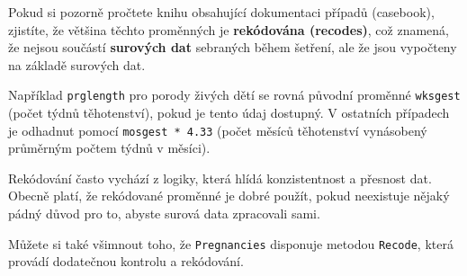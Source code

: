 \documentclass[12pt]{book}
\begin{document}
Pokud si pozorně pročtete knihu obsahující dokumentaci případů (casebook), zjistíte, že většina těchto proměnných je {\bf rekódována (recodes)}, což znamená, že nejsou součástí {\bf surových dat} sebraných během šetření, ale že jsou vypočteny na základě surových dat.

Například {\tt prglength} pro porody živých dětí se rovná původní proměnné {\tt wksgest} (počet týdnů těhotenství), pokud je tento údaj dostupný. V ostatních případech je odhadnut
pomocí {\tt mosgest * 4.33} (počet měsíců těhotenství vynásobený průměrným počtem týdnů v měsíci).

Rekódování často vychází z logiky, která hlídá konzistentnost a přesnost dat. Obecně platí, že rekódované proměnné je dobré použít, pokud neexistuje nějaký pádný důvod pro to, abyste surová data zpracovali sami.

Můžete si také všimnout toho, že {\tt Pregnancies} disponuje metodou {\tt Recode}, která provádí dodatečnou kontrolu a rekódování.
\end{document}
